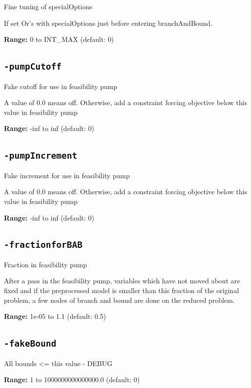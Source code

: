 \documentclass[11pt,a4paper]{article}
\begin{document}
Fine tuning of specialOptions

If set Or's with specialOptions just before entering branchAndBound.

\textbf{Range:} 0 to INT\_MAX (default: 0)

\subsection*{\texttt{-pumpCutoff}}

Fake cutoff for use in feasibility pump

A value of 0.0 means off. Otherwise, add a constraint forcing objective below this value in feasibility pump

\textbf{Range:} -inf to inf (default: 0)

\subsection*{\texttt{-pumpIncrement}}

Fake increment for use in feasibility pump

A value of 0.0 means off. Otherwise, add a constraint forcing objective below this value in feasibility pump

\textbf{Range:} -inf to inf (default: 0)

\subsection*{\texttt{-fractionforBAB}}

Fraction in feasibility pump

After a pass in the feasibility pump, variables which have not moved about are fixed and if the preprocessed model is smaller than this fraction of the original problem, a few nodes of branch and bound are done on the reduced problem.

\textbf{Range:} 1e-05 to 1.1 (default: 0.5)

\subsection*{\texttt{-fakeBound}}

All bounds <= this value - DEBUG

\textbf{Range:} 1 to 1000000000000000.0 (default: 0)
\end{document}
